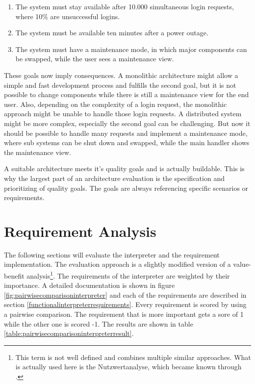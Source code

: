 \begin{enumerate}
	\item The system must stay available after 10.000 simultaneous login requests, where 10\% are unsuccessful logins.
	\item The system must be available ten minutes after a power outage.
	\item The system must have a maintenance mode, in which major components can be swapped, while the user sees a maintenance view.
\end{enumerate}

These goals now imply consequences.
A monolithic architecture might allow a simple and fast development process and fulfills the second goal, but it is not possible to change components while there is still a maintenance view for the end user.
Also, depending on the complexity of a login request, the monolithic approach might be unable to handle those login requests.
A distributed system might be more complex, especially the second goal can be challenging.
But now it should be possible to handle many requests and implement a maintenance mode, where sub systems can be shut down and swapped, while the main handler shows the maintenance view.

A suitable architecture meets it's quality goals and is actually buildable.
This is why the largest part of an architecture evaluation is the specification and prioritizing of quality goals.
The goals are always referencing specific scenarios or requirements.

\section{Requirement Analysis}

The following sections will evaluate the interpreter and the requirement implementation.
The evaluation approach is a slightly modified version of a value-benefit analysis\footnote{This term is not well defined and combines multiple similar approaches. What is actually used here is the Nutzwertanalyse, which became known through \cite{zangemeister_nutzwertanalyse_1976}.}.
The requirements of the interpreter are weighted by their importance.
A detailed documentation is shown in figure \ref{fig:pairwisecomparisoninterpreter} and each of the requirements are described in section \ref{functionalinterpreterrequirements}.
Every requirement is scored by using a pairwise comparison.
The requirement that is more important gets a sore of 1 while the other one is scored -1.
The results are shown in table \ref{table:pairwisecomparisoninterpreterresult}.

